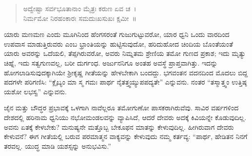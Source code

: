 \begin{verse}
ಅದ್ವೇಷ್ಟಾ ಸರ್ವಭೂತಾನಾಂ ಮೈತ್ರಃ ಕರುಣ ಏವ ಚ~।\\ನಿರ್ಮಮೋ ನಿರಹಂಕಾರಃ ಸಮದುಃಖಸುಖಃ ಕ್ಷಮೀ~॥
\end{verse}

ಯಾರು ಮಣಮಣ ಎಂದು ಮೂಗಿನಿಂದ ಹೆಂಗಸರಂತೆ ಗುಜುಗುಟ್ಟುವರೋ, ಯಾರ ಧ್ವನಿ ಒಂದು ವಾರದಿಂದ ಉಪವಾಸ ಮಾಡುತ್ತಿರುವರು ಎಂಬ ಭ್ರಾಂತಿಯನ್ನು ಹುಟ್ಟಿಸುವುದೋ, ಹರಿದುಹೋದ ಚಿಂದಿಯ ಬೊಂತೆಯಂತೆ ಯಾರು ಅವರನ್ನು ಒದೆಯಲಿ, ತೆಪ್ಪಗಿರುವರೋ, ಅವರು ನಿಮ್ನತಮ ಶ್ರೇಣಿಯ ತಮೋ ಗುಣದ ಪ್ರಕಾಶ; ಇದು ಮೃತ್ಯು ಚಿಹ್ನೆ, ಇದು ಸತ್ವಗುಣವಲ್ಲ, ಬರೀ ದುರ್ಗಂಧ. ಅರ್ಜುನನಿಗೂ ಅಂತಹ ಅವಸ್ಥೆ ಪ್ರಾಪ್ತವಾಗಿತ್ತು. ಇದನ್ನು ಹೋಗಲಾಡಿಸುವುದಕ್ಕಾಗಿಯೇ ಶ‍್ರೀಕೃಷ್ಣ ಗೀತೆಯನ್ನು ಹೇಳಬೇಕಾಗಿ ಬಂದದ್ದು. ಭಗವಂತನ ವದನದಿಂದ ಮೊದಲು ಬಿದ್ದ ಪದಗಳೇ ಪರಿಗಣಿಸಿ: “ಕ್ಲೈಬ್ಯಂ ಮಾ ಸ್ಮ ಗಮಃ ಪಾರ್ಥ ನೈತತ್ತ್ವಯ್ಯುಪಪದ್ಯತೇ” ಎನ್ನುವನು. ನಂತರ “ತಸ್ಮಾತ್ತ್ವಂ ಉತ್ತಿಷ್ಠ ಯಶೋ ಲಭಸ್ವ” ಎನ್ನುವನು.

ಜೈನ ಮತ್ತು ಬೌದ್ಧರ ಪ್ರಭಾವಕ್ಕೆ ಒಳಗಾಗಿ ನಾವೆಲ್ಲರೂ ತಮೋಗುಣೋ ಪಾಸಕರಾಗಿರು\-ವೆವು. ಸಾವಿರ ವರ್ಷಗಳಿಂದ ದೇಶದಲ್ಲಿ ಹರಿನಾಮ ಧ್ವನಿಯು ನಭೋಮಂಡಲವನ್ನು ವ್ಯಾಪಿಸಿದೆ, ಆದರೆ ದೇವರು ಅದಕ್ಕೆ ಕಿವಿಯನ್ನೇ ಕೊಡುವುದಿಲ್ಲ. ಅವನು ಏತಕ್ಕೆ ಕೇಳಬೇಕು? ಮನುಷ್ಯನೇ ಮತ್ತೊಬ್ಬ ಬೇಕೂಫನ ಮಾತನ್ನು ಕೇಳುವುದಿಲ್ಲ. ಹೀಗಿರುವಾಗ ದೇವರು ಕೇಳುವನೆ? ಈಗ ಗೀತೆಯಲ್ಲಿ ಬರುವ ಪರಮಾತ್ಮನ ವಾಕ್ಯವನ್ನು ಕೇಳುವುದು ನಮ್ಮ ಕರ್ತವ್ಯ: “ಪಾರ್ಥ, ಹೇಡಿತನ ನಿನಗೆ ತರವಲ್ಲ. ಯುದ್ಧ ಮಾಡಿ ಯಶಸ್ಸನ್ನು ಅನುಭವಿಸು.”

